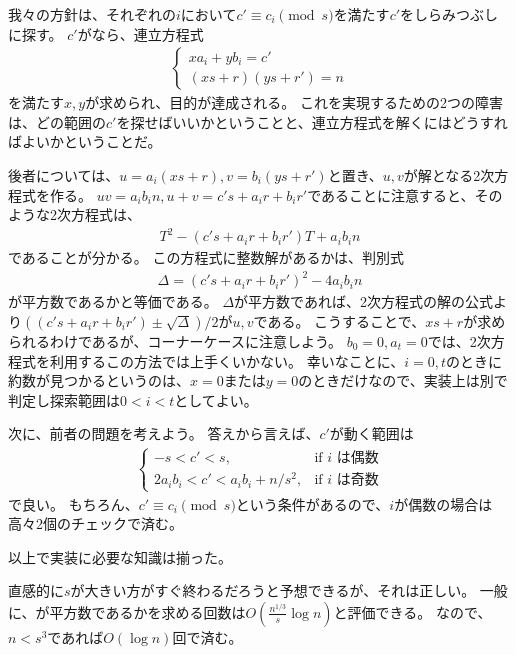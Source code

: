 我々の方針は、それぞれの$i$において$c' \equiv c_i \pmod{s}$を満たす$c'$をしらみつぶしに探す。
$c'$がなら、連立方程式
\begin{align*}
\begin{cases}
xa_i + yb_i = c'\\
(xs+r)(ys+r')=n
\end{cases}
\end{align*}
を満たす$x,y$が求められ、目的が達成される。
これを実現するための2つの障害は、どの範囲の$c'$を探せばいいかということと、連立方程式を解くにはどうすればよいかということだ。

後者については、$u=a_i(xs+r), v=b_i(ys+r')$と置き、$u,v$が解となる2次方程式を作る。
$uv=a_ib_in, u+v=c's+a_ir+b_ir'$であることに注意すると、そのような2次方程式は、
\begin{align*}
T^2 - (c's+a_ir+b_ir')T + a_ib_in
\end{align*}
であることが分かる。
この方程式に整数解があるかは、判別式
\begin{align*}
\Delta = (c's+a_ir+b_ir')^2 - 4a_ib_in
\end{align*}
が平方数であるかと等価である。
$\Delta$が平方数であれば、2次方程式の解の公式より$((c's+a_ir+b_ir')\pm\sqrt{\Delta})/2$が$u,v$である。
こうすることで、$xs+r$が求められるわけであるが、コーナーケースに注意しよう。
$b_0=0, a_t=0$では、2次方程式を利用するこの方法では上手くいかない。
幸いなことに、$i=0,t$のときに約数が見つかるというのは、$x=0$または$y=0$のときだけなので、実装上は別で判定し探索範囲は$0<i<t$としてよい。

次に、前者の問題を考えよう。
答えから言えば、$c'$が動く範囲は
\begin{align*}
\begin{cases}
-s < c' < s, &\mbox{if } i \mbox{ は偶数}\\
2a_ib_i < c' < a_ib_i + n/s^2, &\mbox{if } i \mbox{ は奇数}
\end{cases}
\end{align*}
で良い。
もちろん、$c' \equiv c_i \pmod{s}$という条件があるので、$i$が偶数の場合は高々2個のチェックで済む。

以上で実装に必要な知識は揃った。


直感的に$s$が大きい方がすぐ終わるだろうと予想できるが、それは正しい。
一般に、が平方数であるかを求める回数は$O(\frac{n^{1/3}}{s} \log{n})$と評価できる。
なので、$n<s^3$であれば$O(\log{n})$回で済む。

